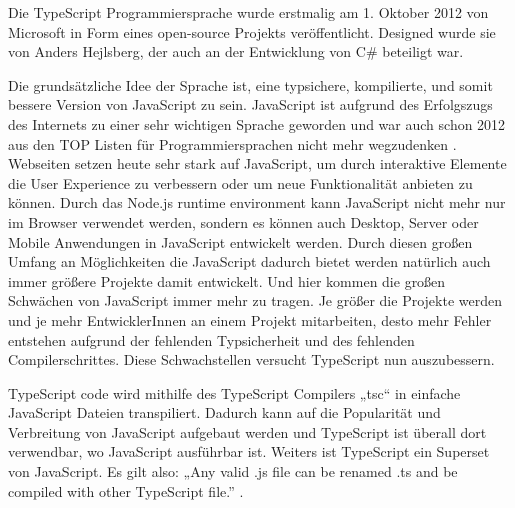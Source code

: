 Die TypeScript Programmiersprache wurde erstmalig am 1. Oktober 2012 
\cite{TypeScriptCodePlexArchived} von 
Microsoft in Form eines open-source Projekts veröffentlicht. Designed wurde sie 
von Anders Hejlsberg, der auch an der Entwicklung von C\# beteiligt war. 

Die grundsätzliche Idee der Sprache ist, eine typsichere, kompilierte, und somit 
bessere Version von JavaScript zu sein. JavaScript ist aufgrund des Erfolgszugs
des Internets zu einer sehr wichtigen Sprache geworden und war auch schon 2012 
aus den TOP Listen für Programmiersprachen nicht mehr wegzudenken 
\cite{StackOverflowSurvey,TIOBEIndex,PYPL}. 
Webseiten setzen heute sehr stark auf JavaScript, um durch interaktive Elemente 
die User Experience zu verbessern oder um neue Funktionalität anbieten zu können. 
Durch das Node.js runtime environment kann JavaScript nicht mehr nur im Browser 
verwendet werden, sondern es können auch Desktop, Server oder Mobile Anwendungen 
in JavaScript entwickelt werden. Durch diesen großen Umfang an Möglichkeiten die 
JavaScript dadurch bietet werden natürlich auch immer größere Projekte damit entwickelt. 
Und hier kommen die großen Schwächen von JavaScript immer mehr zu tragen. 
Je größer die Projekte werden und je mehr EntwicklerInnen an einem Projekt 
mitarbeiten, desto mehr Fehler entstehen aufgrund der fehlenden Typsicherheit
und des fehlenden Compilerschrittes. Diese Schwachstellen versucht TypeScript 
nun auszubessern.

TypeScript code wird mithilfe des TypeScript Compilers „tsc“ in einfache JavaScript 
Dateien transpiliert. Dadurch kann auf die Popularität und Verbreitung von JavaScript 
aufgebaut werden und TypeScript ist überall dort verwendbar, wo JavaScript 
ausführbar ist. Weiters ist TypeScript ein Superset von JavaScript. 
Es gilt also: „Any valid .js file can be renamed .ts and be compiled with other 
TypeScript file.” \cite{MaharryDanTR}. 

